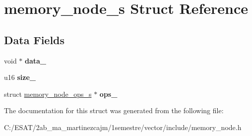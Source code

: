 \hypertarget{structmemory__node__s}{}\section{memory\+\_\+node\+\_\+s Struct Reference}
\label{structmemory__node__s}
\subsection*{Data Fields}
\begin{DoxyCompactItemize}
\item 
\mbox{\label{structmemory__node__s_a7b24176d394890c1567b43bf7d82f2d4}} 
void $\ast$ {\bfseries data\+\_\+}
\item 
\mbox{\label{structmemory__node__s_aeb03175defbd0acf26a7eee7be42061d}} 
u16 {\bfseries size\+\_\+}
\item 
\mbox{\label{structmemory__node__s_a9e0658104c2e954054e0606f3827bb93}} 
struct \hyperlink{structmemory__node__ops__s}{memory\+\_\+node\+\_\+ops\+\_\+s} $\ast$ {\bfseries ops\+\_\+}
\end{DoxyCompactItemize}


The documentation for this struct was generated from the following file\+:\begin{DoxyCompactItemize}
\item 
C\+:/\+E\+S\+A\+T/2ab\+\_\+ma\+\_\+martinezcajm/1semestre/vector/include/memory\+\_\+node.\+h\end{DoxyCompactItemize}
